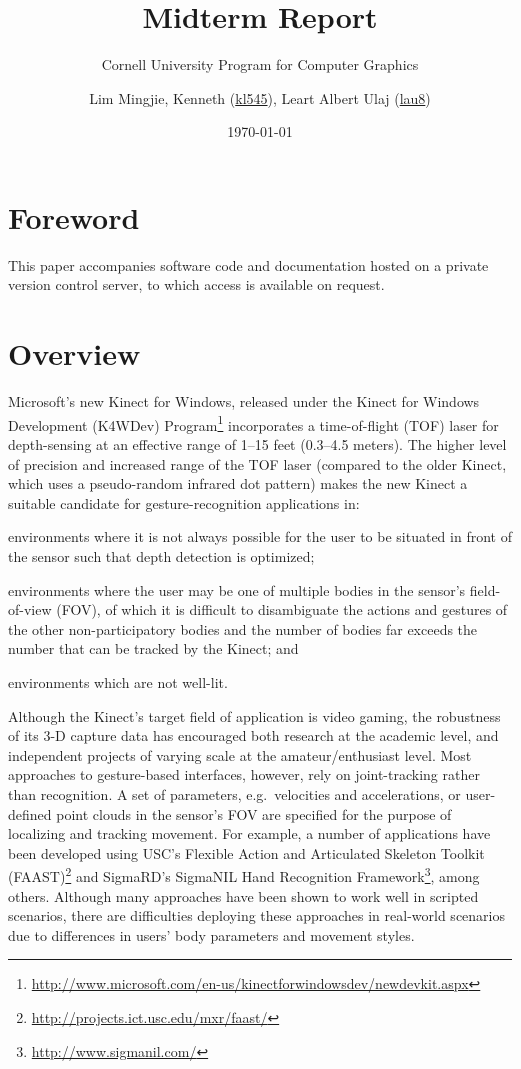 \documentclass{scrartcl}
\title{Midterm Report}
\subtitle{Cornell University Program for Computer Graphics}
\author{Lim Mingjie, Kenneth (\href{mailto:kl545@cornell.edu}{kl545}), Leart Albert Ulaj (\href{mailto:lau8@cornell.edu}{lau8})}
\date{\today}
\numberwithin{equation}{section}
\begin{document}
  \maketitle
  \tableofcontents
  \newpage
  \section{Foreword}
    This paper accompanies software code and documentation hosted on a private version control server, to which access is available on request.
  \section{Overview}
    Microsoft's new Kinect for Windows, released under the Kinect for Windows Development (K4WDev) Program\footnote{\url{http://www.microsoft.com/en-us/kinectforwindowsdev/newdevkit.aspx}} incorporates a time-of-flight (TOF) laser for depth-sensing at an effective range of 1--15 feet (0.3--4.5 meters). The higher level of precision and increased range of the TOF laser (compared to the older Kinect, which uses a pseudo-random infrared dot pattern) makes the new Kinect a suitable candidate for gesture-recognition applications in:\begin{inparaenum}[(1)]
      \item environments where it is not always possible for the user to be situated in front of the sensor such that depth detection is optimized;
      \item environments where the user may be one of multiple bodies in the sensor's field-of-view (FOV), of which it is difficult to disambiguate the actions and gestures of the other non-participatory bodies and the number of bodies far exceeds the number that can be tracked by the Kinect; and
      \item environments which are not well-lit.
    \end{inparaenum}

    Although the Kinect's target field of application is video gaming, the robustness of its 3-D capture data has encouraged both research at the academic level, and independent projects of varying scale at the amateur/enthusiast level. Most approaches to gesture-based interfaces, however, rely on joint-tracking rather than recognition. A set of parameters, e.g.~velocities and accelerations, or user-defined point clouds in the sensor's FOV are specified for the purpose of localizing and tracking movement. For example, a number of applications have been developed using USC's Flexible Action and Articulated Skeleton Toolkit (FAAST)\footnote{\url{http://projects.ict.usc.edu/mxr/faast/}} and SigmaRD's SigmaNIL Hand Recognition Framework\footnote{\url{http://www.sigmanil.com/}}, among others. Although many approaches have been shown to work well in scripted scenarios, there are difficulties deploying these approaches in real-world scenarios due to differences in users' body parameters and movement styles.
\end{document}

